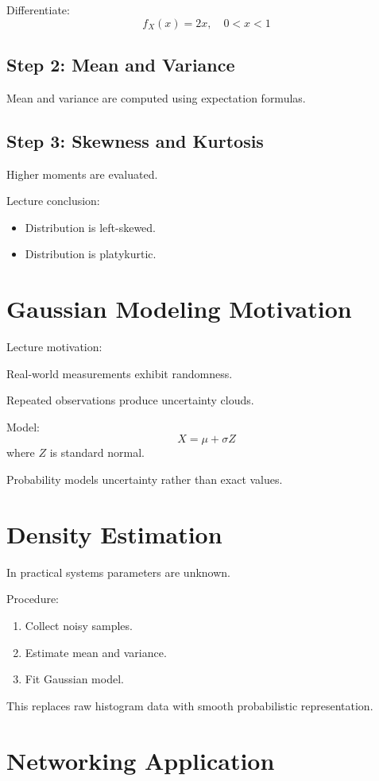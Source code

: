 \documentclass{article}
\begin{document}
Differentiate:
\[
f_X(x) = 2x, \quad 0<x<1
\]

\subsection*{Step 2: Mean and Variance}

Mean and variance are computed using expectation formulas.

\subsection*{Step 3: Skewness and Kurtosis}

Higher moments are evaluated.

Lecture conclusion:
\begin{itemize}
    \item Distribution is left-skewed.
    \item Distribution is platykurtic.
\end{itemize}

\section{Gaussian Modeling Motivation}

Lecture motivation:

Real-world measurements exhibit randomness.

Repeated observations produce uncertainty clouds.

Model:
\[
X = \mu + \sigma Z
\]
where $Z$ is standard normal.

Probability models uncertainty rather than exact values.

\section{Density Estimation}

In practical systems parameters are unknown.

Procedure:
\begin{enumerate}
    \item Collect noisy samples.
    \item Estimate mean and variance.
    \item Fit Gaussian model.
\end{enumerate}

This replaces raw histogram data with smooth probabilistic representation.

\section{Networking Application}
\end{document}
